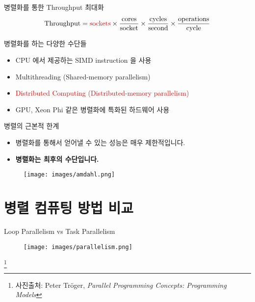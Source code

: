 \documentclass{bredelebeamer}
\begin{document}
\begin{frame}{병렬화를 통한 Throughput 최대화}
  \begin{align*}
    \text{Throughput} = \text{\textcolor{red}{sockets}} \times
    \frac{\text{cores}}{\text{socket}} \times
    \frac{\text{cycles}}{\text{second}} \times
    \frac{\text{operations}}{\text{cycle}}
  \end{align*}
  \begin{block}{병렬화를 하는 다양한 수단들}
    \begin{itemize}
    \item CPU 에서 제공하는 SIMD instruction 을 사용
    \item Multithreading (Shared-memory parallelism)
    \item \textcolor{red}{Distributed Computing (Distributed-memory parallelism)}
    \item GPU, Xeon Phi 같은 병렬화에 특화된 하드웨어 사용
    \end{itemize}
  \end{block}
\end{frame}

\begin{frame}{병렬의 근본적 한계}
  \begin{itemize}
    \item 병렬화를 통해서 얻어낼 수 있는 성능은 매우 제한적입니다.
    \item \textbf{병렬화는 최후의 수단입니다.}
  \end{itemize}
  \begin{figure}
    \texttt{[image: images/amdahl.png]}
  \end{figure}
\end{frame}

\section{병렬 컴퓨팅 방법 비교}
\begin{frame}{Loop Parallelism vs Task Parallelism}
  \begin{figure}
    \texttt{[image: images/parallelism.png]}
  \end{figure}\footnote{사진출처: Peter Tröger, \textit{Parallel Programming Concepts: Programming Models}}
\end{frame}

\end{document}
